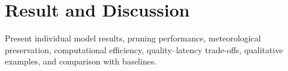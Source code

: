 \section{Result and Discussion}
Present individual model results, pruning performance, meteorological preservation, computational efficiency, quality–latency trade-offs, qualitative examples, and comparison with baselines. \cite{Moore99}